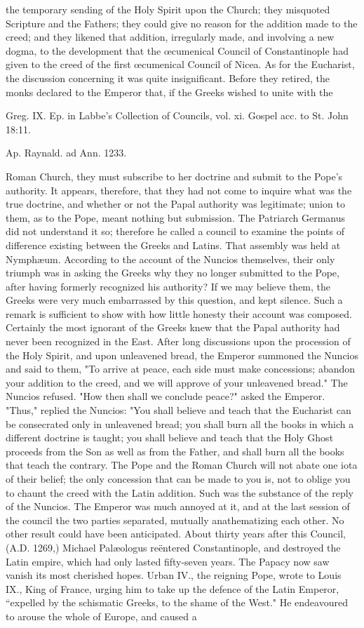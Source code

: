 the temporary sending of the Holy Spirit upon the Church; they misquoted Scripture and the Fathers; they could give no reason for the addition made to the creed; and they likened that addition, irregularly made, and involving a new dogma, to the development that the œcumenical Council of Constantinople had given to the creed of the first œcumenical Council of Nicea. As for the Eucharist, the discussion concerning it was quite insignificant. Before they retired, the monks declared to the Emperor that, if the Greeks wished to unite with the

Greg. IX. Ep. in Labbe’s Collection of Councils, vol. xi. Gospel acc. to St. John 18:11.

Ap. Raynald. ad Ann. 1233.

Roman Church, they must subscribe to her doctrine and submit to the Pope's authority. It appears, therefore, that they had not come to inquire what was the true doctrine, and whether or not the Papal authority was legitimate; union to them, as to the Pope, meant nothing but submission. The Patriarch Germanus did not understand it so; therefore he called a council to examine the points of difference existing between the Greeks and Latins. That assembly was held at Nymphæum. According to the account of the Nuncios themselves, their only triumph was in asking the Greeks why they no longer submitted to the Pope, after having formerly recognized his authority? If we may believe them, the Greeks were very much embarrassed by this question, and kept silence. Such a remark is sufficient to show with how little honesty their account was composed. Certainly the most ignorant of the Greeks knew that the Papal authority had never been recognized in the East. After long discussions upon the procession of the Holy Spirit, and upon unleavened bread, the Emperor summoned the Nuncios and said to them, "To arrive at peace, each side must make concessions; abandon your addition to the creed, and we will approve of your unleavened bread." The Nuncios refused. "How then shall we conclude peace?" asked the Emperor. "Thus," replied the Nuncios: "You shall believe and teach that the Eucharist can be consecrated only in unleavened bread; you shall burn all the books in which a different doctrine is taught; you shall believe and teach that the Holy Ghost proceeds from the Son as well as from the Father, and shall burn all the books that teach the contrary. The Pope and the Roman Church will not abate one iota of their belief; the only concession that can be made to you is, not to oblige you to chaunt the creed with the Latin addition. Such was the substance of the reply of the Nuncios. The Emperor was much annoyed at it, and at the last session of the council the two parties separated, mutually anathematizing each other. No other result could have been anticipated. About thirty years after this Council, (A.D. 1269,) Michael Palæologus reëntered Constantinople, and destroyed the Latin empire, which had only lasted fifty-seven years. The Papacy now saw vanish its most cherished hopes. Urban IV., the reigning Pope, wrote to Louis IX., King of France, urging him to take up the defence of the Latin Emperor, “expelled by the schismatic Greeks, to the shame of the West." He endeavoured to arouse the whole of Europe, and caused a 